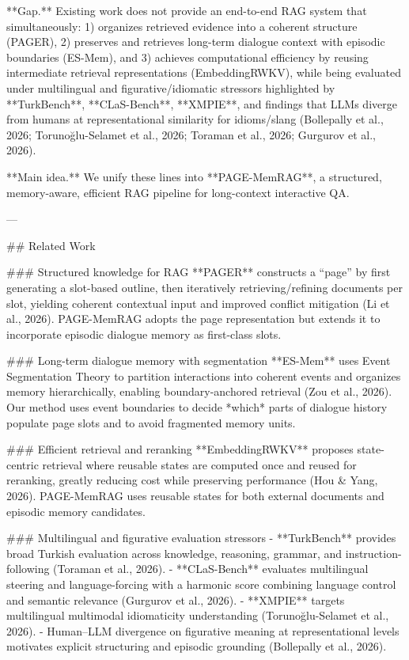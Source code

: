 **Gap.** Existing work does not provide an end-to-end RAG system that simultaneously:  
1) organizes retrieved evidence into a coherent structure (PAGER),  
2) preserves and retrieves long-term dialogue context with episodic boundaries (ES-Mem), and  
3) achieves computational efficiency by reusing intermediate retrieval representations (EmbeddingRWKV),  
while being evaluated under multilingual and figurative/idiomatic stressors highlighted by **TurkBench**, **CLaS-Bench**, **XMPIE**, and findings that LLMs diverge from humans at representational similarity for idioms/slang (Bollepally et al., 2026; Torunoğlu-Selamet et al., 2026; Toraman et al., 2026; Gurgurov et al., 2026).

**Main idea.** We unify these lines into **PAGE-MemRAG**, a structured, memory-aware, efficient RAG pipeline for long-context interactive QA.

---

## Related Work  

### Structured knowledge for RAG  
**PAGER** constructs a “page” by first generating a slot-based outline, then iteratively retrieving/refining documents per slot, yielding coherent contextual input and improved conflict mitigation (Li et al., 2026). PAGE-MemRAG adopts the page representation but extends it to incorporate episodic dialogue memory as first-class slots.

### Long-term dialogue memory with segmentation  
**ES-Mem** uses Event Segmentation Theory to partition interactions into coherent events and organizes memory hierarchically, enabling boundary-anchored retrieval (Zou et al., 2026). Our method uses event boundaries to decide *which* parts of dialogue history populate page slots and to avoid fragmented memory units.

### Efficient retrieval and reranking  
**EmbeddingRWKV** proposes state-centric retrieval where reusable states are computed once and reused for reranking, greatly reducing cost while preserving performance (Hou & Yang, 2026). PAGE-MemRAG uses reusable states for both external documents and episodic memory candidates.

### Multilingual and figurative evaluation stressors  
- **TurkBench** provides broad Turkish evaluation across knowledge, reasoning, grammar, and instruction-following (Toraman et al., 2026).  
- **CLaS-Bench** evaluates multilingual steering and language-forcing with a harmonic score combining language control and semantic relevance (Gurgurov et al., 2026).  
- **XMPIE** targets multilingual multimodal idiomaticity understanding (Torunoğlu-Selamet et al., 2026).  
- Human–LLM divergence on figurative meaning at representational levels motivates explicit structuring and episodic grounding (Bollepally et al., 2026).  

